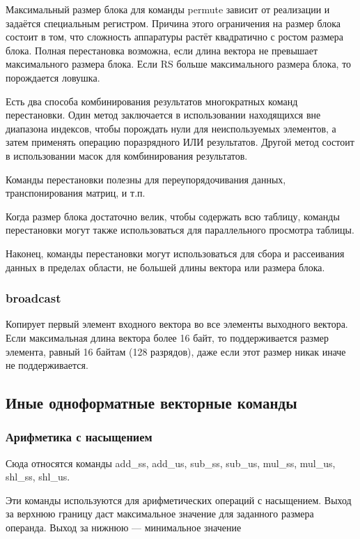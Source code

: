 \documentclass[forwardcom.tex]{subfiles}
\begin{document}
Максимальный размер блока для команды permute зависит от реализации и задаётся специальным регистром. Причина этого ограничения на размер блока состоит в том, что сложность аппаратуры растёт квадратично с ростом размера блока. Полная перестановка возможна, если длина вектора не превышает максимального размера блока. Если RS больше максимального размера блока, то порождается ловушка.

Есть два способа комбинирования результатов многократных команд перестановки. Один метод заключается в использовании находящихся вне диапазона индексов, чтобы порождать нули для неиспользуемых элементов, а затем применять операцию поразрядного ИЛИ результатов. Другой метод состоит в использовании масок для комбинирования результатов.

Команды перестановки полезны для переупорядочивания данных, транспонирования матриц, и т.п.

Когда размер блока достаточно велик, чтобы содержать всю таблицу, команды перестановки могут также использоваться для параллельного просмотра таблицы.

Наконец, команды перестановки могут использоваться для сбора и рассеивания данных в пределах области, не большей длины вектора или размера блока.

\subsubsection{broadcast}
Копирует первый элемент входного вектора во все элементы выходного вектора. Если максимальная длина вектора более 16 байт, то поддерживается размер элемента, равный 16 байтам (128 разрядов), даже если этот размер никак иначе не поддерживается.

\subsection{Иные одноформатные векторные команды}
\subsubsection{Арифметика с насыщением} \label{saturatedArithmeticInstructions}
Сюда относятся команды add\_ss, add\_us, sub\_ss, sub\_us, mul\_ss, mul\_us, shl\_ss, shl\_us.

Эти команды используются для арифметических операций с насыщением. Выход за верхнюю границу даст максимальное значение для заданного размера операнда. Выход за нижнюю --- минимальное значение
\end{document}
